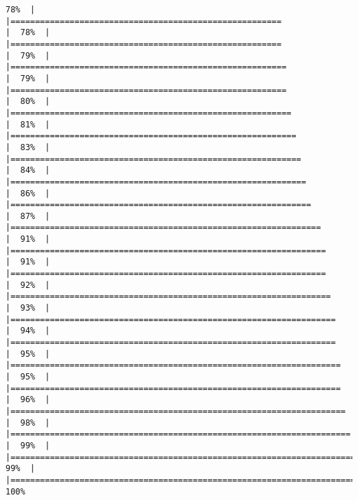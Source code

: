 \documentclass[
]{article}
\begin{document}
\begin{verbatim}
78%  |                                                                              |=======================================================               |  78%  |                                                                              |=======================================================               |  79%  |                                                                              |========================================================              |  79%  |                                                                              |========================================================              |  80%  |                                                                              |=========================================================             |  81%  |                                                                              |==========================================================            |  83%  |                                                                              |===========================================================           |  84%  |                                                                              |============================================================          |  86%  |                                                                              |=============================================================         |  87%  |                                                                              |===============================================================       |  91%  |                                                                              |================================================================      |  91%  |                                                                              |================================================================      |  92%  |                                                                              |=================================================================     |  93%  |                                                                              |==================================================================    |  94%  |                                                                              |==================================================================    |  95%  |                                                                              |===================================================================   |  95%  |                                                                              |===================================================================   |  96%  |                                                                              |====================================================================  |  98%  |                                                                              |===================================================================== |  99%  |                                                                              |======================================================================|  99%  |                                                                              |======================================================================| 100%

\end{verbatim}
\end{document}
